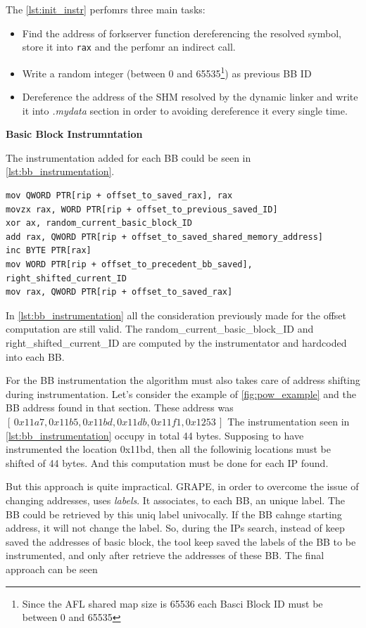 The \cref{lst:init_instr} perfomrs three main tasks:
\begin{itemize}
    \item Find the address of forkserver function dereferencing the resolved symbol, store it into \texttt{rax} and the perfomr an indirect call.
    \item Write a random integer (between 0 and 65535\footnote{
        Since the AFL shared map size is 65536 each Basci Block ID must be between 0 and 65535
    }) as previous \gls{BB} ID
    \item Dereference the address of the \gls{SHM} resolved by the dynamic linker and write it into \textit{.mydata} section in 
        order to avoiding dereference it every single time. 
\end{itemize}

\begin{center}
\textbf{Basic Block Instrumntation}    
\end{center}
The instrumentation added for each \gls{BB} could be seen in \cref{lst:bb_instrumentation}.

\begin{lstlisting}[caption={Basic Block Instrumentation},label=lst:bb_instrumentation]
mov QWORD PTR[rip + offset_to_saved_rax], rax
movzx rax, WORD PTR[rip + offset_to_previous_saved_ID]        
xor ax, random_current_basic_block_ID
add rax, QWORD PTR[rip + offset_to_saved_shared_memory_address]
inc BYTE PTR[rax]
mov WORD PTR[rip + offset_to_precedent_bb_saved], right_shifted_current_ID
mov rax, QWORD PTR[rip + offset_to_saved_rax]
\end{lstlisting}

In \cref{lst:bb_instrumentation} all the consideration previously made for the offset computation are still valid. 
The random\_current\_basic\_block\_ID and right\_shifted\_current\_ID are computed by the instrumentator and hardcoded into each \gls{BB}.

For the \gls{BB} instrumentation the algorithm must also takes care of address shifting during instrumentation.
Let's consider the example of \cref{fig:pow_example} and the \gls{BB} address found in that section.
These address was $[\, 0x11a7 , 0x11b5, 0x11bd , 0x11db , 0x11f1 , 0x1253 \,]$
The instrumentation seen in \cref{lst:bb_instrumentation} occupy in total 44 bytes.
Supposing to have instrumented the location 0x11bd, then all the followinig locations must be shifted of 44 bytes.
And this computation must be done for each \gls{IP} found.

But this approach is quite impractical.
GRAPE, in order to overcome the issue of changing addresses, uses \textit{labels}.
It associates, to each \gls{BB}, an unique label. The \gls{BB} could be retrieved by this uniq label univocally.
If the \gls{BB} cahnge starting address, it will not change the label.
So, during the \gls{IP}s search, instead of keep saved the addresses of basic block, the tool keep saved the labels 
of the \gls{BB} to be instrumented, and only after retrieve the addresses of these \gls{BB}.
The final approach can be seen 

